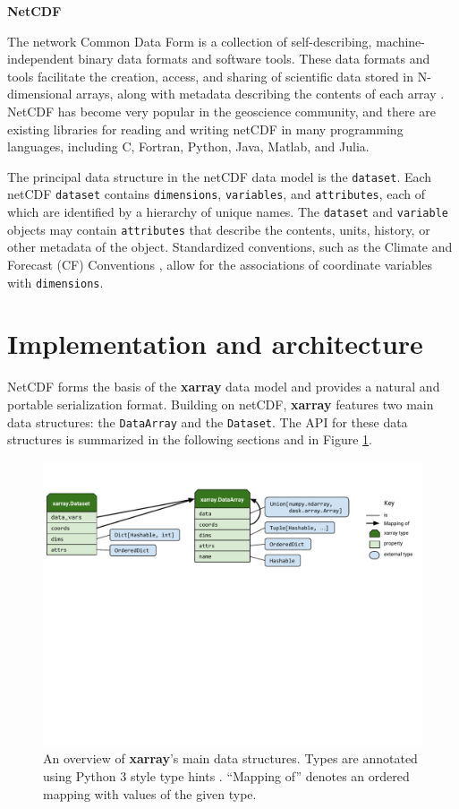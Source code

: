 \documentclass{jors}
\begin{document}
\textbf{NetCDF}

The network Common Data Form is a collection of self-describing, machine-independent binary data formats and software tools.
These data formats and tools facilitate the creation, access, and sharing of scientific data stored in N-dimensional arrays, along with metadata describing the contents of each array \citep{Rew_1990}.
NetCDF has become very popular in the geoscience community, and there are existing libraries for reading and writing netCDF in many programming languages, including C, Fortran, Python, Java, Matlab, and Julia.

The principal data structure in the netCDF data model is the \verb|dataset|.
Each netCDF \verb|dataset| contains \verb|dimensions|, \verb|variables|, and \verb|attributes|, each of which are identified by a hierarchy of unique names.
The \verb|dataset| and \verb|variable| objects may contain \verb|attributes| that describe the contents, units, history, or other metadata of the object.
Standardized conventions, such as the Climate and Forecast (CF) Conventions \citep{eaton2003netcdf}, allow for the associations of coordinate variables with \verb|dimensions|.

\section*{Implementation and architecture}

NetCDF forms the basis of the \textbf{xarray} data model and provides a natural and portable serialization format.
Building on netCDF, \textbf{xarray} features two main data structures: the \verb|DataArray| and the \verb|Dataset|.
The API for these data structures is summarized in the following sections and in Figure \ref{fig:xarray-public-api}.

\begin{figure}
	\centering
	\includegraphics[width=\textwidth]{xarray-public-api}
	\caption{An overview of \textbf{xarray}'s main data structures. Types are annotated using Python 3 style type hints \cite{pep484}. ``Mapping of'' denotes an ordered mapping with values of the given type.}
	\label{fig:xarray-public-api}
\end{figure}
\end{document}
